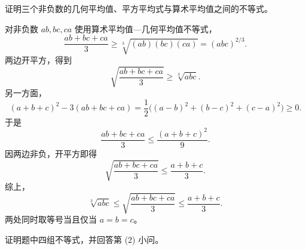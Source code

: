 \begin{xexercise}[4]
证明三个非负数的几何平均值、平方平均式与算术平均值之间的不等式。
\end{xexercise}
\begin{xsolution}
对非负数 $ab,bc,ca$ 使用算术平均值—几何平均值不等式，
\[
  \frac{ab+bc+ca}{3}
  \ge\sqrt[3]{(ab)(bc)(ca)}
  =(abc)^{2/3}.
\]
两边开平方，得到
\[
  \sqrt{\frac{ab+bc+ca}{3}}\ge\sqrt[3]{abc}.
\]
另一方面，
\[
  (a+b+c)^2-3(ab+bc+ca)
  =\frac12\bigl((a-b)^2+(b-c)^2+(c-a)^2\bigr)\ge0.
\]
于是
\[
  \frac{ab+bc+ca}{3}\le\frac{(a+b+c)^2}{9}.
\]
因两边非负，开平方即得
\[
  \sqrt{\frac{ab+bc+ca}{3}}\le\frac{a+b+c}{3}.
\]
综上，
\[
  \sqrt[3]{abc}\le\sqrt{\frac{ab+bc+ca}{3}}\le\frac{a+b+c}{3}.
\]
两处同时取等号当且仅当 $a=b=c$。
\end{xsolution}

\begin{xexercise}[5]
证明题中四组不等式，并回答第 (2) 小问。
\end{xexercise}
